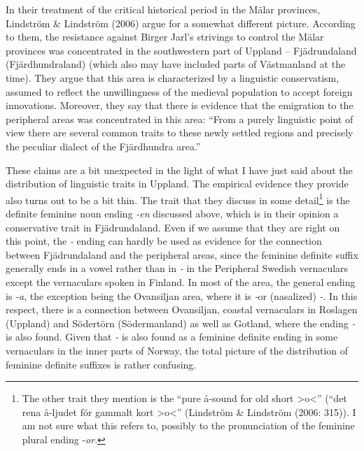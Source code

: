 In their treatment of the critical historical period in the Mälar provinces, Lindström \& Lindström (2006) argue for a somewhat different picture. According to them, the resistance against Birger Jarl’s strivings to control the Mälar provinces was concentrated in the southwestern part of Uppland – Fjädrundaland (Fjärdhundraland) (which also may have included parts of Västmanland at the time). They argue that this area is characterized by a linguistic conservatism, assumed to reflect the unwillingness of the medieval population to accept foreign innovations. Moreover, they say that there is evidence that the emigration to the peripheral areas was concentrated in this area: “From a purely linguistic point of view there are several common traits to these newly settled regions and precisely the peculiar dialect of the Fjärdhundra area.”

These claims are a bit unexpected in the light of what I have just said about the distribution of linguistic traits in Uppland. The empirical evidence they provide also turns out to be a bit thin. The trait that they discuss in some detail\footnote{ The other trait they mention is the “pure å-sound for old short {\textgreater}o{\textless}” (“det rena å-ljudet för gammalt kort {\textgreater}o{\textless}” (Lindström \& Lindström (2006: 315)). I am not sure what this refers to, possibly to the pronunciation of the feminine plural ending -\textit{o}\textit{r}.} is the definite feminine noun ending \textit{{}-en} discussed above, which is in their opinion a conservative trait in Fjädrundaland. Even if we assume that they are right on this point, the\textit{ {}-} ending can hardly be used as evidence for the connection between Fjädrundaland and the peripheral areas, since the feminine definite suffix generally ends in a vowel rather than in\textit{ {}-} in the Peripheral Swedish vernaculars except the vernaculars spoken in Finland.  In most of the area, the general ending is\textit{ {}-a}, the exception being the Ovansiljan area, where it is\textit{ {}-}or (nasalized)\textit{ {}-}. In this respect, there is a connection between Ovansiljan, coastal vernaculars in Roslagen (Uppland) and Södertörn (Södermanland) as well as Gotland, where the ending\textit{ {}-} is also found. Given that\textit{ {}-} is also found as a feminine definite ending in some vernaculars in the inner parts of Norway, the total picture of the distribution of feminine definite suffixes is rather confusing. 

